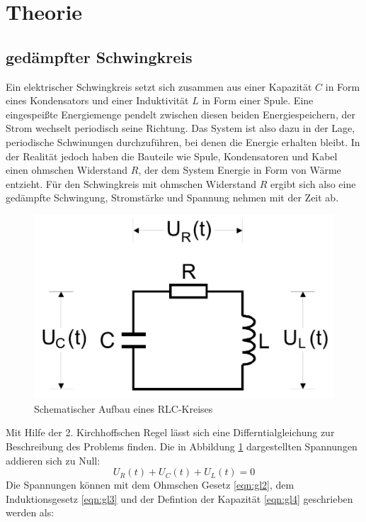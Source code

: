 \section{Theorie}
\label{sec:Theorie}

\subsection{gedämpfter Schwingkreis}
\label{sec:gedämpft}

Ein elektrischer Schwingkreis setzt sich zusammen aus einer Kapazität $C$ in Form eines Kondensators und einer Induktivität $L$ in Form einer Spule.
Eine eingespeißte Energiemenge pendelt zwischen diesen beiden Energiespeichern, der Strom wechselt periodisch seine Richtung.
Das System ist also dazu in der Lage, periodische Schwinungen durchzuführen, bei denen die Energie erhalten bleibt.
In der Realität jedoch haben die Bauteile wie Spule, Kondensatoren und Kabel einen ohmschen Widerstand $R$, der dem System Energie in Form von Wärme entzieht.
Für den Schwingkreis mit ohmschen Widerstand $R$ ergibt sich also eine gedämpfte Schwingung, Stromstärke und Spannung nehmen mit der Zeit ab.
\begin{figure}
  \centering
  \includegraphics[width=\textwidth]{abb1.jpg}
  \caption{Schematischer Aufbau eines RLC-Kreises\cite{manualV354}}
  \label{fig:abb1}
\end{figure}
Mit Hilfe der 2. Kirchhoffschen Regel lässt sich eine Differntialgleichung zur Beschreibung des Problems finden.
Die in Abbildung \ref{fig:abb1} dargestellten Spannungen addieren sich zu Null:
\begin{equation}
  U_R(t) + U_C(t) + U_L(t)  = 0
  \label{eqn:gl1}
\end{equation}
Die Spannungen können mit dem Ohmschen Gesetz \eqref{eqn:gl2}, dem Induktionsgesetz \eqref{eqn:gl3} und der Defintion der Kapazität \eqref{eqn:gl4} geschrieben werden als:
